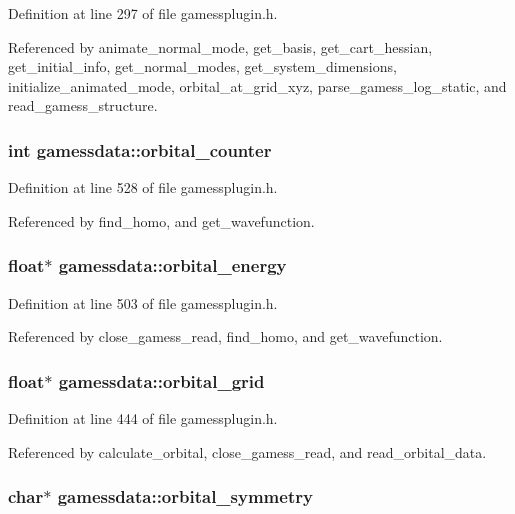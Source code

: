 Definition at line 297 of file gamessplugin.h.

Referenced by animate\_\-normal\_\-mode, get\_\-basis, get\_\-cart\_\-hessian, get\_\-initial\_\-info, get\_\-normal\_\-modes, get\_\-system\_\-dimensions, initialize\_\-animated\_\-mode, orbital\_\-at\_\-grid\_\-xyz, parse\_\-gamess\_\-log\_\-static, and read\_\-gamess\_\-structure.
\subsubsection{\setlength{\rightskip}{0pt plus 5cm}int gamessdata::orbital\_\-counter}\label{structgamessdata_m74}




Definition at line 528 of file gamessplugin.h.

Referenced by find\_\-homo, and get\_\-wavefunction.
\subsubsection{\setlength{\rightskip}{0pt plus 5cm}float$\ast$ gamessdata::orbital\_\-energy}\label{structgamessdata_m68}




Definition at line 503 of file gamessplugin.h.

Referenced by close\_\-gamess\_\-read, find\_\-homo, and get\_\-wavefunction.
\subsubsection{\setlength{\rightskip}{0pt plus 5cm}float$\ast$ gamessdata::orbital\_\-grid}\label{structgamessdata_m57}




Definition at line 444 of file gamessplugin.h.

Referenced by calculate\_\-orbital, close\_\-gamess\_\-read, and read\_\-orbital\_\-data.
\subsubsection{\setlength{\rightskip}{0pt plus 5cm}char$\ast$ gamessdata::orbital\_\-symmetry}\label{structgamessdata_m66}




